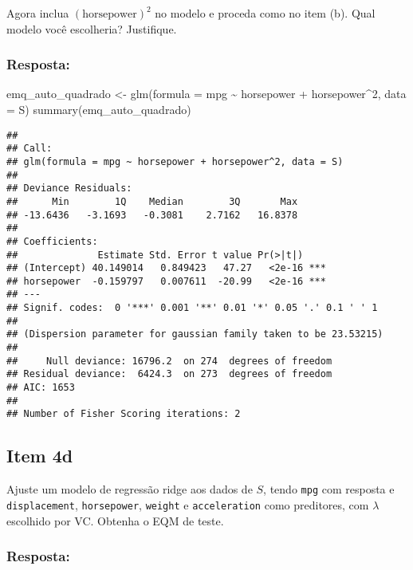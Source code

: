 \documentclass[
]{article}
\newenvironment{Shaded}{\begin{snugshade}}{\end{snugshade}}
\newcommand{\AttributeTok}[1]{\textcolor[rgb]{0.77,0.63,0.00}{#1}}
\newcommand{\DecValTok}[1]{\textcolor[rgb]{0.00,0.00,0.81}{#1}}
\newcommand{\FunctionTok}[1]{\textcolor[rgb]{0.00,0.00,0.00}{#1}}
\newcommand{\NormalTok}[1]{#1}
\newcommand{\OtherTok}[1]{\textcolor[rgb]{0.56,0.35,0.01}{#1}}
\newcommand{\SpecialCharTok}[1]{\textcolor[rgb]{0.00,0.00,0.00}{#1}}
\begin{document}
Agora inclua \((\text{horsepower})^2\) no modelo e proceda como no item
(b). Qual modelo você escolheria? Justifique.

\hypertarget{resposta-8}{%
\subsubsection{Resposta:}\label{resposta-8}}

\begin{Shaded}
\begin{Highlighting}[]
\NormalTok{emq\_auto\_quadrado }\OtherTok{\textless{}{-}} \FunctionTok{glm}\NormalTok{(}\AttributeTok{formula =}\NormalTok{ mpg }\SpecialCharTok{\textasciitilde{}}\NormalTok{ horsepower }\SpecialCharTok{+}\NormalTok{ horsepower}\SpecialCharTok{\^{}}\DecValTok{2}\NormalTok{, }\AttributeTok{data =}\NormalTok{ S) }
\FunctionTok{summary}\NormalTok{(emq\_auto\_quadrado)}
\end{Highlighting}
\end{Shaded}

\begin{verbatim}
## 
## Call:
## glm(formula = mpg ~ horsepower + horsepower^2, data = S)
## 
## Deviance Residuals: 
##      Min        1Q    Median        3Q       Max  
## -13.6436   -3.1693   -0.3081    2.7162   16.8378  
## 
## Coefficients:
##              Estimate Std. Error t value Pr(>|t|)    
## (Intercept) 40.149014   0.849423   47.27   <2e-16 ***
## horsepower  -0.159797   0.007611  -20.99   <2e-16 ***
## ---
## Signif. codes:  0 '***' 0.001 '**' 0.01 '*' 0.05 '.' 0.1 ' ' 1
## 
## (Dispersion parameter for gaussian family taken to be 23.53215)
## 
##     Null deviance: 16796.2  on 274  degrees of freedom
## Residual deviance:  6424.3  on 273  degrees of freedom
## AIC: 1653
## 
## Number of Fisher Scoring iterations: 2
\end{verbatim}

\hypertarget{item-4d}{%
\subsection{Item 4d}\label{item-4d}}

Ajuste um modelo de regressão ridge aos dados de \(S\), tendo
\texttt{mpg} com resposta e \texttt{displacement}, \texttt{horsepower},
\texttt{weight} e \texttt{acceleration} como preditores, com \(\lambda\)
escolhido por VC. Obtenha o EQM de teste.

\hypertarget{resposta-9}{%
\subsubsection{Resposta:}\label{resposta-9}}
\end{document}
